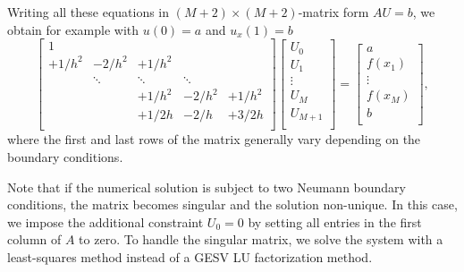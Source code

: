 Writing all these equations in $(M+2) \times (M+2)$-matrix form $AU=b$, we obtain for example with $u(0) = a$ and $u_x(1) = b$
\begin{equation}
\renewcommand{\arraystretch}{1.5} %
\begin{bmatrix}
1 \\
+1/h^2 & -2/h^2 & +1/h^2 &   \\
  & \ddots & \ddots & \ddots & \\
  &   & +1/h^2 & -2/h^2 & +1/h^2 \\
  &   & +1/2h & -2/h & +3/2h \\
\end{bmatrix}
\begin{bmatrix}
U_0 \\ U_1 \\ \vdots \\ U_M \\ U_{M+1} \\
\end{bmatrix}
=
\begin{bmatrix}
a \\ f(x_1) \\ \vdots \\ f(x_M) \\ b \\
\end{bmatrix}
,
\label{matrix_system}
\end{equation}
where the first and last rows of the matrix generally vary depending on the boundary conditions.

Note that if the numerical solution is subject to two Neumann boundary conditions, the matrix becomes singular and the solution non-unique.
In this case, we impose the additional constraint $U_0 = 0$ by setting all entries in the first column of $A$ to zero.
To handle the singular matrix, we solve the system with a least-squares method instead of a GESV LU factorization method.

